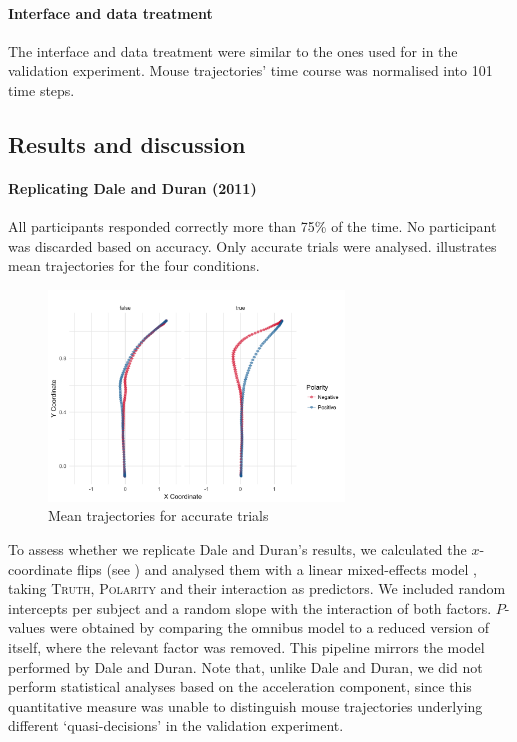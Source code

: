 \documentclass{article}
\begin{document}
\paragraph{Interface and data treatment}
The interface and data treatment were similar to the ones used for in the validation experiment. Mouse trajectories' time course was normalised into 101 time steps.

\subsection{Results and discussion}
\paragraph{Replicating Dale and Duran (2011)}
All participants responded correctly more than 75\% of the time. No participant was discarded based on accuracy.  Only accurate trials were analysed.  illustrates mean trajectories for the four conditions.
\begin{figure}
\centering
\includegraphics[width=0.7\textwidth]{negation-data-mean-trajectory.png}
\caption{Mean trajectories for accurate trials} \label{fig:mean.trajectory-negation}
\end{figure}

To assess whether we replicate Dale and Duran's results, we calculated the $x$-coordinate flips (see ) and analysed them with a linear mixed-effects model \citep{baayen2008mixed}, taking \textsc{Truth}, \textsc{Polarity} and their interaction as predictors. We included random intercepts per subject and a random slope with the interaction of both factors. $P$-values were obtained by comparing the omnibus model to a reduced version of itself, where the relevant factor was removed. This pipeline mirrors the model performed by Dale and Duran. 
Note that, unlike Dale and Duran, we did not perform statistical analyses based on the acceleration component, since this quantitative measure was unable to distinguish mouse trajectories underlying different `quasi-decisions' in the validation experiment.
\end{document}
